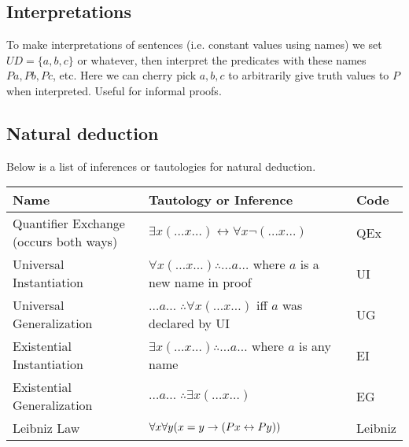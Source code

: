 \subsection{Interpretations}

To make interpretations of sentences (i.e. constant values using names) we set $UD=\{a,b,c\}$ or whatever,
then interpret the predicates with these names $Pa,Pb,Pc$, etc. Here we can cherry pick $a,b,c$ to arbitrarily give truth values to $P$ when interpreted. Useful for informal proofs.

\subsection{Natural deduction}

Below is a list of inferences or tautologies for natural deduction.

\begin{tabular}{l|l|l}
    Name & Tautology or Inference & Code\\
    \hline
    \hline
    Quantifier Exchange (occurs both ways) & $\exists x(\dots x \dots)\leftrightarrow \forall x \lnot(\dots x\dots)$ & QEx\\
    Universal Instantiation & $\forall x(\dots x\dots)\therefore \dots a \dots$ where $a$ is a new name in proof & UI\\
    Universal Generalization & $\dots a \dots\; \therefore\forall x(\dots x\dots)$ iff $a$ was declared by UI & UG\\
    Existential Instantiation & $\exists x(\dots x\dots)\therefore \dots a\dots$ where $a$ is any name & EI\\
    Existential Generalization & $\dots a\dots \;\therefore\exists x(\dots x\dots)$ & EG\\
    Leibniz Law & $\forall x\forall y(x=y\rightarrow (Px\leftrightarrow Py))$ & Leibniz
\end{tabular}